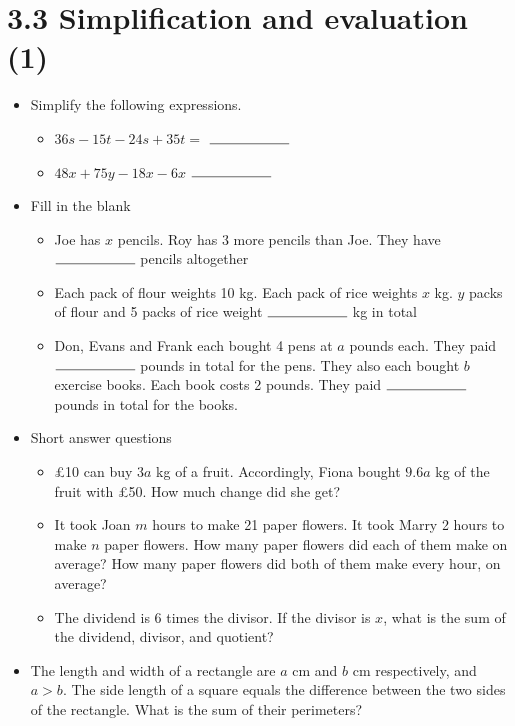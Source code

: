 \documentclass{article}%
\begin{document}
%
\section*{3.3 Simplification and evaluation (1)}%
\begin{itemize}%
\item%
Simplify the following expressions.%
\begin{itemize}%
\item%
$36s-15t-24s+35t=$ $\rule{2cm}{0.15mm}$%
\item%
$48x+75y-18x-6x$ $\rule{2cm}{0.15mm}$%
\end{itemize}%
\item%
Fill in the blank%
\begin{itemize}%
\item%
Joe has $x$ pencils. Roy has 3 more pencils than Joe. They have $\rule{2cm}{0.15mm}$ pencils altogether%
\item%
Each pack of flour weights 10 kg. Each pack of rice weights $x$ kg. $y$ packs of flour and 5 packs of rice weight $\rule{2cm}{0.15mm}$ kg in total%
\item%
Don, Evans and Frank each bought 4 pens at $a$ pounds each. They paid $\rule{2cm}{0.15mm}$ pounds in total for the pens. They also each bought $b$ exercise books. Each book costs 2 pounds. They paid $\rule{2cm}{0.15mm}$ pounds in total for the books.%
\end{itemize}%
\item%
Short answer questions%
\begin{itemize}%
\item%
\pounds10 can buy $3a$ kg of a fruit. Accordingly, Fiona bought $9.6a$ kg of the fruit with \pounds50. How much change did she get?%
\item%
It took Joan $m$ hours to make 21 paper flowers. It took Marry 2 hours to make $n$ paper flowers. How many paper flowers did each of them make on average? How many paper flowers did both of them make every hour, on average?%
\item%
The dividend is 6 times the divisor. If the divisor is $x$, what is the sum of the dividend, divisor, and quotient?%
\end{itemize}%
\item%
The length and width of a rectangle are $a$ cm and $b$ cm respectively, and $a>b$. The side length of a square equals the difference between the two sides of the rectangle. What is the sum of their perimeters?%
\end{itemize}

%
\end{document}

